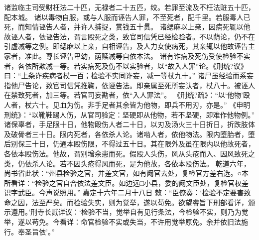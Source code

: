 \documentclass[12pt,UTF8]{ctexbook}
\begin{document}
诸监临主司受财枉法二十匹，无禄者二十五匹，绞。若罪至流及不枉法赃五十匹，配本城。
诸以毒物自服，或与人服而诬告人罪，不至死者，配千里。若服毒人已死，而知情诬告人者，并许人捕捉，赏钱五十贯。
诸缌麻以上亲，因病死辄以他故诬人者，依诬告法，谓言殴死之类，致官司信凭已经检验者。不以荫论，仍不在引虚减等之例。即缌麻以上亲，自相诬告，及人力女使病死，其亲辄以他故诬告主家者，准此。尊长诬告卑幼，荫赎减等自依本法。
诸有诈病及死伤受使检验不实者，各依所欺减一等。若实病死及伤不以实验者，以“故入人罪”论。《刑统?议》曰：“上条诈疾病者杖一百；检验不实同诈妄，减一等杖九十。”
诸尸虽经验而系妄指他尸告论，致官司信凭推鞠，依诬告法。即亲属至死所妄认者，杖八十。被诬人在禁致死者，加三等。若官司妄勘者，依“入人罪法”。
《刑统?疏》：“以‘他物’殴人者，杖六十。见血为伤。非手足者其余皆为他物，即兵不用刃，亦是。”
《申明刑统》：“以靴鞋踢人伤，从官司验定：坚硬即从他物，若不坚硬，即难作他物例。”
诸保辜者，手足限十日，他物殴伤人者二十日，以刃及汤火三十日折日，折跌肢体及破骨者三十日。限内死者，各依杀人论。诸啮人者，依他物法。限内堕胎者，堕后别保三十日，仍通本殴伤限，不得过五十日。其在限外及虽在限内以他故死者，各依本殴伤法。他故，谓别增余患而死。假殴人头伤，风从头疮而入、因风致死之类，仍依杀人论。若不因头疮得风而死，是为他故，各依本殴伤法。
乾道六年，尚书省此状：“州县检验之官，并差文官，如有阙官去处，复检官方差右选。○本所看详：“检验之官自合依法差文臣。如边远□小县，委的阙文臣处，复检官权差识字武臣。今声说照用。”
嘉定十六年二月十八日
敕：“臣僚奏：‘检验不定要害致命之因，法至严矣。而检验失实，则为觉举，遂以苟免。欲望睿旨下刑部看详，颁示遵用。’刑寺长贰详议：‘检验不当，觉举自有见行条法，今检验不实，则乃为觉举，遂以苟免。今看详：命官检验不实或失当，不许用觉举原免。余并依旧法施行。奉圣旨依’。”
\end{document}
